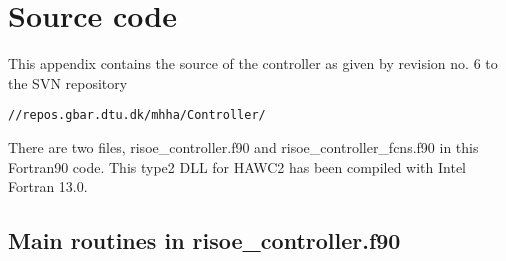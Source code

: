 \appendix
\chapter{Source code} \label{ch:source}

This appendix contains the source of the controller as given by revision no. 6 to the SVN repository
\begin{verbatim}//repos.gbar.dtu.dk/mhha/Controller/\end{verbatim}
There are two files, risoe\_controller.f90 and risoe\_controller\_fcns.f90 in this Fortran90 code. This type2 DLL for HAWC2 has been compiled with Intel Fortran 13.0.

\section{Main routines in risoe\_controller.f90}
